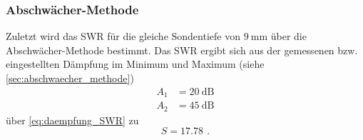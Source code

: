 \subsubsection{Abschwächer-Methode}
Zuletzt wird das SWR für die gleiche Sondentiefe von $\SI{9}{\milli\metre}$ über die Abschwächer-Methode bestimmt.
Das SWR ergibt sich aus der gemessenen bzw. eingestellten Dämpfung im Minimum und Maximum (siehe \autoref{sec:abschwaecher_methode})
\begin{align*}
    A_1 &= \SI{20}{\dB} \\
    A_2 &= \SI{45}{\dB}
\end{align*}
über \autoref{eq:daempfung_SWR} zu
\begin{equation}
    S = \SI{17.78}{} \, .
\end{equation}